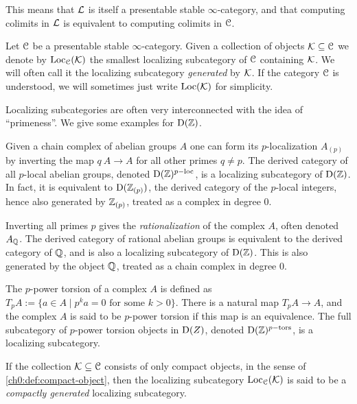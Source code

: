 This means that $\mathcal{L}$ is itself a presentable stable $\infty$-category, and that computing colimits in $\mathcal{L}$ is equivalent to computing colimits in $\EuScript{C}$. 

\begin{definition}
    Let $\EuScript{C}$ be a presentable stable $\infty$-category. Given a collection of objects $\mathcal{K}\subseteq \EuScript{C}$ we denote by $\operatorname{Loc}_{\EuScript{C}}(\mathcal{K})$ the smallest localizing subcategory of $\EuScript{C}$ containing $\mathcal{K}$. We will often call it the localizing subcategory \emph{generated} by $\mathcal{K}$. If the category $\EuScript{C}$ is understood, we will sometimes just write $\operatorname{Loc}(\mathcal{K})$ for simplicity.
\end{definition}

Localizing subcategories are often very interconnected with the idea of ``primeness''. We give some examples for $\mathrm{D}(\mathbb{Z})$. 

\begin{example}
    \label{ch0:ex:p-local-ab}
    Given a chain complex of abelian groups $A$ one can form its $p$-localization $A_{(p)}$ by inverting the map $q\: A\to A$ for all other primes $q\neq p$. The derived category of all $p$-local abelian groups, denoted $\mathrm{D}(\mathbb{Z})^{p-\mathrm{loc}}$, is a localizing subcategory of $\mathrm{D}(\mathbb{Z})$. In fact, it is equivalent to $\mathrm{D}(\mathbb{Z}_{(p)})$, the derived category of the $p$-local integers, hence also generated by $\mathbb{Z}_{(p)}$, treated as a complex in degree $0$. 
\end{example}

\begin{example}
    \label{ch0:ex:rational-ab}
    Inverting all primes $p$ gives the \emph{rationalization} of the complex $A$, often denoted $A_{\mathbb{Q}}$. The derived category of rational abelian groups is equivalent to the derived category of $\mathbb{Q}$, and is also a localizing subcategory of $\mathrm{D}(\mathbb{Z})$. This is also generated by the object $\mathbb{Q}$, treated as a chain complex in degree $0$. 
\end{example}

\begin{example}
    \label{ch0:ex:p-torsion-ab}
    The $p$-power torsion of a complex $A$ is defined as $T_p A := \{a\in A \mid p^k a = 0 \text{ for some }k > 0\}$. There is a natural map $T_p A\to A$, and the complex $A$ is said to be $p$-power torsion if this map is an equivalence. The full subcategory of $p$-power torsion objects in $\mathrm{D}(Z)$, denoted $\mathrm{D}(\mathbb{Z})^{p-\mathrm{tors}}$, is a localizing subcategory.  
\end{example}

\begin{remark}
    \label{ch0:rm:compactly-generated-localizing-subcategory}
    If the collection $\mathcal{K} \subseteq \EuScript{C}$ consists of only compact objects, in the sense of \cref{ch0:def:compact-object}, then the localizing subcategory $\operatorname{Loc}_{\EuScript{C}}(\mathcal{K})$ is said to be a \emph{compactly generated} localizing subcategory. 
\end{remark}

